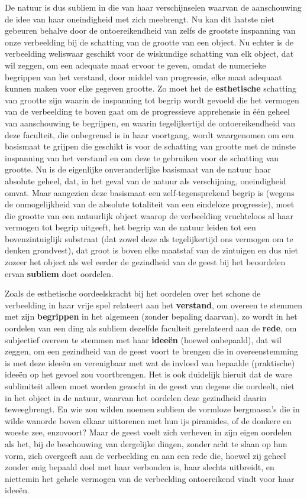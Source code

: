 De natuur is dus subliem in die van haar verschijnselen waarvan de aanschouwing de idee van haar oneindigheid met zich meebrengt. Nu kan dit laatste niet gebeuren behalve door de ontoereikendheid van zelfs de grootste inspanning van onze verbeelding bij de schatting van de grootte van een object. Nu echter is de verbeelding weliswaar geschikt voor de wiskundige schatting van elk object, dat wil zeggen, om een adequate maat ervoor te geven, omdat de numerieke begrippen van het verstand, door middel van progressie, elke maat adequaat kunnen maken voor elke gegeven grootte. Zo moet het de \textbf{esthetische} schatting van grootte zijn waarin de inspanning tot begrip wordt gevoeld die het vermogen van de verbeelding te boven gaat om de progressieve apprehensie in één geheel van aanschouwing te begrijpen, en waarin tegelijkertijd de ontoereikendheid van deze faculteit, die onbegrensd is in haar voortgang, wordt waargenomen om een basismaat te grijpen die geschikt is voor de schatting van grootte met de minste inspanning van het verstand en om deze te gebruiken voor de schatting van grootte. Nu is de eigenlijke onveranderlijke basismaat van de natuur haar absolute geheel, dat, in het geval van de natuur als verschijning, oneindigheid omvat. Maar aangezien deze basismaat een zelf-tegensprekend begrip is (wegens de onmogelijkheid van de absolute totaliteit van een eindeloze progressie), moet die grootte van een natuurlijk object waarop de verbeelding vruchteloos al haar vermogen tot begrip uitgeeft, het begrip van de natuur leiden tot een bovenzintuiglijk substraat (dat zowel deze als tegelijkertijd ons vermogen om te denken grondvest), dat groot is boven elke maatstaf van de zintuigen en dus niet zozeer het object als wel eerder de gezindheid van de geest bij het beoordelen ervan \textbf{subliem} doet oordelen.

Zoals de esthetische oordeelskracht bij het oordelen over het schone de verbeelding in haar vrije spel relateert aan het \textbf{verstand}, om overeen te stemmen met zijn \textbf{begrippen} in het algemeen (zonder bepaling daarvan), zo wordt in het oordelen van een ding als subliem dezelfde faculteit gerelateerd aan de \textbf{rede}, om subjectief overeen te stemmen met haar \textbf{ideeën} (hoewel onbepaald), dat wil zeggen, om een gezindheid van de geest voort te brengen die in overeenstemming is met deze ideeën en verenigbaar met wat de invloed van bepaalde (praktische) ideeën op het gevoel zou voortbrengen. Het is ook duidelijk hieruit dat de ware sublimiteit alleen moet worden gezocht in de geest van degene die oordeelt, niet in het object in de natuur, waarvan het oordelen deze gezindheid daarin teweegbrengt. En wie zou wilden noemen subliem de vormloze bergmassa’s die in wilde wanorde boven elkaar uittorenen met hun ijs piramides, of de donkere en woeste zee, enzovoort? Maar de geest voelt zich verheven in zijn eigen oordelen als het, bij de beschouwing van dergelijke dingen, zonder acht te slaan op hun vorm, zich overgeeft aan de verbeelding en aan een rede die, hoewel zij geheel zonder enig bepaald doel met haar verbonden is, haar slechts uitbreidt, en niettemin het gehele vermogen van de verbeelding ontoereikend vindt voor haar ideeën.

